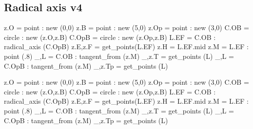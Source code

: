 \subsection{Radical axis v4} %
\label{sub:radical_axis_v4}
\begin{tkzexample}[latex=0cm,small,code only]
\begin{tkzelements}
   z.O     = point : new (0,0)
   z.B     = point : new (5,0)
   z.Op    = point : new (3,0)
   C.OB    = circle :    new (z.O,z.B)
   C.OpB   = circle :    new (z.Op,z.B)
   L.EF    = C.OB : radical_axis (C.OpB)
   z.E,z.F = get_points(L.EF)
   z.H     = L.EF.mid
   z.M     = L.EF : point (.8)
   _,L     = C.OB : tangent_from (z.M)
   _,z.T   = get_points (L)
   _,L     = C.OpB : tangent_from (z.M)
   _,z.Tp  = get_points (L)
\end{tkzelements}
\end{tkzexample}


\begin{tkzelements}
   z.O     = point : new (0,0)
   z.B     = point : new (5,0)
   z.Op    = point : new (3,0)
   C.OB    = circle :    new (z.O,z.B)
   C.OpB   = circle :    new (z.Op,z.B)
   L.EF    = C.OB : radical_axis (C.OpB)
   z.E,z.F = get_points(L.EF)
   z.H     = L.EF.mid
   z.M     = L.EF : point (.8)
   _,L     = C.OB : tangent_from (z.M)
   _,z.T   = get_points (L)
   _,L     = C.OpB : tangent_from (z.M)
   _,z.Tp  = get_points (L)
\end{tkzelements}
\hspace*{\fill}
\hspace*{\fill}

